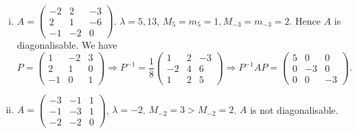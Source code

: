 \documentclass[a4paper]{article}
\begin{document}
    \begin{example}
      \begin{enumerate}[(i)]
        \item $A=
          \begin{pmatrix}
            -2 & 2 & -3 \\
            2 & 1 & -6 \\
            -1 & -2 & 0
          \end{pmatrix}$. $ \lambda=5,13 $, $ M_5=m_5=1,
          M_{-3}=m_{-3}=2 $. Hence $A$ is diagonalisable. We have
          \[
            P=
            \begin{pmatrix}
              1&-2&3\\
              2&1&0\\
              -1&0&1
            \end{pmatrix} \Longrightarrow P^{-1}=\frac{1}{8}
            \begin{pmatrix}
              1&2&-3\\
              -2&4&6\\
              1&2&5
            \end{pmatrix}\Longrightarrow
            P^{-1}AP=
            \begin{pmatrix}
              5&0&0\\
              0&-3&0\\
              0&0&-3
            \end{pmatrix}
          .\]
        \item $ A=
          \begin{pmatrix}
            -3&-1&1\\
            -1&-3&1\\
            -2&-2&0
          \end{pmatrix}$, $ \lambda=-2 $. $ M_{-2}=3>M_{-2}=2 $. $A$
          is not diagonalisable.
      \end{enumerate}
    \end{example}
\end{document}
